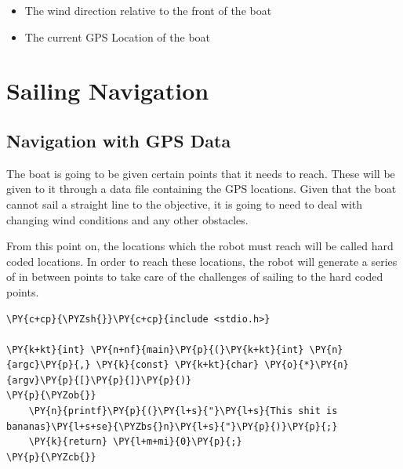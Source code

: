 \documentclass[letterpaper]{article}
\begin{document}




\nocite{*}


\begin{itemize}
	\item The wind direction relative to the front of the boat
	\item The current GPS Location of the boat
\end{itemize}
\section{Sailing Navigation} %
\label{sec:Sailing Navigation}

\subsection{Navigation with GPS Data} %
\label{sec:Navigation with GPS Data}

The boat is going to be given certain points that it needs to reach.
These will be given to it through a data file containing the GPS
locations. Given that the boat cannot sail a straight line to the
objective, it is going to need to deal with changing wind conditions and
any other obstacles.

From this point on, the locations which the robot must reach will be called
hard coded locations. In order to reach these locations, the robot will generate
a series of in between points to take care of the challenges of sailing to the
hard coded points.

\begin{Verbatim}[commandchars=\\\{\}]
\PY{c+cp}{\PYZsh{}}\PY{c+cp}{include <stdio.h>}

\PY{k+kt}{int} \PY{n+nf}{main}\PY{p}{(}\PY{k+kt}{int} \PY{n}{argc}\PY{p}{,} \PY{k}{const} \PY{k+kt}{char} \PY{o}{*}\PY{n}{argv}\PY{p}{[}\PY{p}{]}\PY{p}{)}
\PY{p}{\PYZob{}}
	\PY{n}{printf}\PY{p}{(}\PY{l+s}{"}\PY{l+s}{This shit is bananas}\PY{l+s+se}{\PYZbs{}n}\PY{l+s}{"}\PY{p}{)}\PY{p}{;}
	\PY{k}{return} \PY{l+m+mi}{0}\PY{p}{;}
\PY{p}{\PYZcb{}}
\end{Verbatim}

\end{document}
